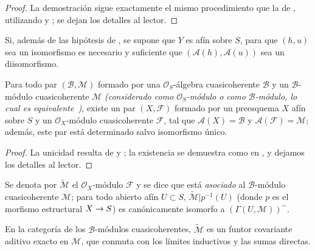 \documentclass[oneside,10pt]{amsart}
\makeatletter
\newcommand{\ega@arrow}[2]{\mathchoice{#1}{#2}{#2}{#2}}
\renewcommand{\to}{\ega@arrow{\longrightarrow}{\rightarrow}}
\newcommand{\oldpage}[2][]{\marginnote{\normalfont\footnotesize\textbf{#1}~|~#2}\ignorespaces}
\let\EGAOriginalLabel\label
\renewcommand{\label}[1]{\phantomsection\EGAOriginalLabel{#1}}
\makeatother
\begin{document}
\begin{proof}
La demostración sigue exactamente el mismo procedimiento que la de , utilizando  y ; se dejan los detalles al lector.
\end{proof}

\begin{corollary}[1.4.2]
\label{II.1.4.2-fr}
Si, además de las hipótesis de , se supone que $Y$ es afín sobre $S$, para que $(h,u)$ sea un isomorfismo es necesario y suficiente que $(\mathcal{A}(h),\mathcal{A}(u))$ sea un diisomorfismo.
\end{corollary}

\oldpage[II]{10}
\begin{proposition}[1.4.3]
\label{II.1.4.3-fr}

Para todo par $(\mathcal{B},\mathcal{M})$ formado por una $\mathcal{O}_S$-álgebra cuasicoherente $\mathcal{B}$ y un $\mathcal{B}$-módulo cuasicoherente $\mathcal{M}$ \emph{(considerado como $\mathcal{O}_S$-módulo o como $\mathcal{B}$-módulo, lo cual es equivalente~)}, existe un par $(X,\mathcal{F})$ formado por un preesquema $X$ afín sobre $S$ y un $\mathcal{O}_X$-módulo cuasicoherente $\mathcal{F}$, tal que $\mathcal{A}(X)=\mathcal{B}$ y $\mathcal{A}(\mathcal{F})=\mathcal{M}$; además, este par está determinado salvo isomorfismo único.
\end{proposition}

\begin{proof}
La unicidad resulta de  y ; la existencia se demuestra como en , y dejamos los detalles al lector.
\end{proof}

Se denota por $\widetilde{\mathcal{M}}$ el $\mathcal{O}_X$-módulo $\mathcal{F}$ y se dice que está \emph{asociado} al $\mathcal{B}$-módulo cuasicoherente $\mathcal{M}$; para todo abierto afín $U\subset S$, $\widetilde{\mathcal{M}}|p^{-1}(U)$ (donde $p$ es el morfismo estructural $X\to S$) es canónicamente isomorfo a $(\Gamma(U,\mathcal{M}))^{\sim}$.

\begin{corollary}[1.4.4]
\label{II.1.4.4-fr}
En la categoría de los $\mathcal{B}$-módulos cuasicoherentes, $\widetilde{\mathcal{M}}$ es un funtor covariante aditivo exacto en $\mathcal{M}$, que conmuta con los límites inductivos y las sumas directas.
\end{corollary}
\end{document}
